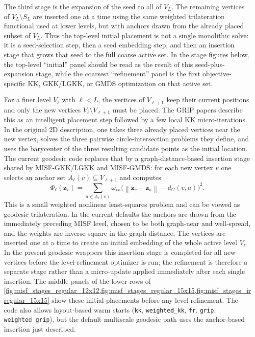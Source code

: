 \documentclass[11pt]{article}
\newcommand{\bz}{\mathbf{z}}
\newcommand{\norm}[1]{\left\|#1\right\|}
\begin{document}
The third stage is the expansion of the seed to all of $V_L$.  The remaining
vertices of $V_L \setminus S_L$ are inserted one at a time using the same
weighted trilateration functional used at lower levels, but with anchors drawn
from the already placed subset of $V_L$.  Thus the top-level initial placement
is not a single monolithic solve: it is a seed-selection step, then a seed
embedding step, and then an insertion stage that grows that seed to the full
coarse active set.  In the stage figures below, the top-level ``initial'' panel
should be read as the result of this seed-plus-expansion stage, while the
coarsest ``refinement'' panel is the first objective-specific KK, GKK/LGKK, or
GMDS optimization on that active set.

For a finer level $V_\ell$ with $\ell < L$, the vertices of $V_{\ell+1}$ keep
their current positions and only the new vertices
$V_\ell \setminus V_{\ell+1}$ must be placed.  The GRIP papers describe this as
an intelligent placement step followed by a few local KK micro-iterations.  In
the original $2$D description, one takes three already placed vertices near the
new vertex, solves the three pairwise circle-intersection problems they define,
and uses the barycenter of the three resulting candidate points as the initial
location.  The current geodesic code replaces that by a graph-distance-based
insertion stage shared by MISF-GKK/LGKK and MISF-GMDS:
for each new vertex $v$ one selects an anchor set
$A_\ell(v) \subseteq V_{\ell+1}$ and computes
\[
  \Phi_\ell(\bz_v)
  =
  \sum_{a \in A_\ell(v)}
  \omega_{va}
  \bigl( \norm{\bz_v - \bz_a} - d_G(v,a) \bigr)^2.
\]
This is a small weighted nonlinear least-squares problem and can be viewed as
geodesic trilateration.  In the current defaults the anchors are drawn from the
immediately preceding MISF level, chosen to be both graph-near and
well-spread, and the weights are inverse-square in the graph distance.  The
vertices are inserted one at a time to create an initial embedding of the whole
active level $V_\ell$.  In the present geodesic wrappers this insertion stage
is completed for all new vertices before the level-refinement optimizer is run;
the refinement is therefore a separate stage rather than a micro-update applied
immediately after each single insertion.  The middle panels of the lower rows of
\cref{fig:misf_stages_regular_12x12,fig:misf_stages_regular_15x15,fig:misf_stages_irregular_15x15}
show these initial placements before any level refinement.  The code also
allows layout-based warm starts (\texttt{kk}, \texttt{weighted\_kk},
\texttt{fr}, \texttt{grip}, \texttt{weighted\_grip}), but the default
multiscale geodesic path uses the anchor-based insertion just described.
\end{document}
